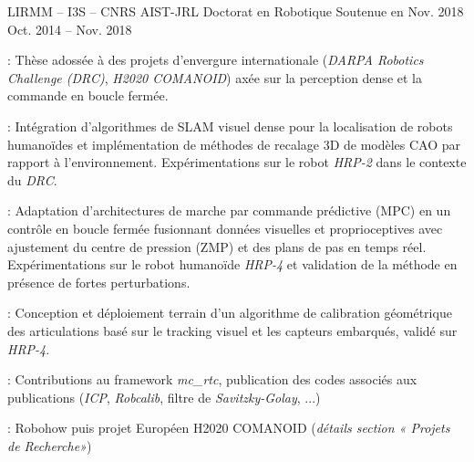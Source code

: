 \begin{cventries}
  \cventry
  {LIRMM -- I3S -- CNRS AIST-JRL} %
  {Doctorat en Robotique} %
  {Soutenue en Nov. 2018} %
  {Oct. 2014 -- Nov. 2018} %
  {
    \begin{cvitems} %
    \item {} : Thèse adossée à des projets d'envergure internationale
      (\emph{DARPA Robotics Challenge (DRC)}, \emph{H2020 COMANOID}) axée sur la perception dense et la
      commande en boucle fermée.
    \item {} : Intégration d'algorithmes de SLAM visuel dense
      pour la localisation de robots humanoïdes et implémentation de méthodes de recalage 3D de modèles CAO
      par rapport à l'environnement. Expérimentations sur le robot \emph{HRP-2} dans le contexte du \emph{DRC}.
    \item {} : Adaptation d'architectures de marche par
      commande prédictive (MPC) en un contrôle en boucle fermée fusionnant données visuelles et
      proprioceptives avec ajustement du centre de pression (ZMP) et des plans de pas en temps réel.
      Expérimentations sur le robot humanoïde \emph{HRP-4} et validation de la méthode en présence de fortes
      perturbations.
    \item {} : Conception et déploiement terrain d'un algorithme
      de calibration géométrique des articulations basé sur le tracking visuel et les capteurs embarqués,
      validé sur \emph{HRP-4}.
    \item {} : Contributions au framework \emph{mc\_rtc},
      publication des codes associés aux publications (\emph{ICP}, \emph{Robcalib}, filtre de
      \emph{Savitzky-Golay}, ...)
    \item {} : Robohow puis projet Européen H2020 COMANOID
      (\emph{détails section « Projets de Recherche»})
    \end{cvitems}
  }


\end{cventries}
